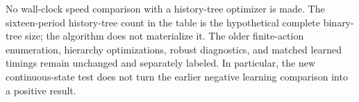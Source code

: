 No wall-clock speed comparison with a history-tree optimizer is made. The sixteen-period history-tree count in the table is the hypothetical complete binary-tree size; the algorithm does not materialize it. The older finite-action enumeration, hierarchy optimizations, robust diagnostics, and matched learned timings remain unchanged and separately labeled. In particular, the new continuous-state test does not turn the earlier negative learning comparison into a positive result.
